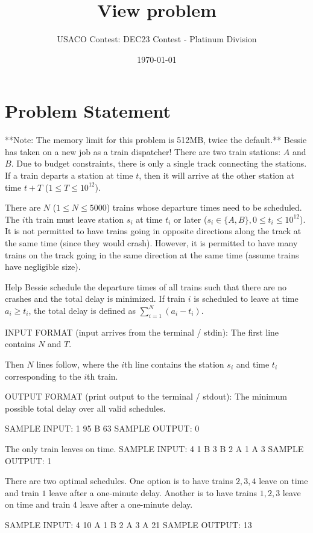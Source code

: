 \documentclass[12pt]{article}
\title{View problem}
\author{USACO Contest: DEC23 Contest - Platinum Division}
\date{\today}
\begin{document}
\maketitle

\section*{Problem Statement}


**Note: The memory limit for this problem is 512MB, twice the default.**
Bessie has taken on a new job as a train dispatcher! There are two train
stations: $A$ and $B$. Due to budget constraints, there is only a single track
connecting the stations. If a train departs a station at time $t$, then it will
arrive at the other station at time $t+T$ ($1\le T\le 10^{12}$).

There are $N$ ($1\le N\le 5000$) trains whose departure times need to be
scheduled. The $i$th train must leave station $s_i$ at time $t_i$ or later
($s_i\in \{A, B\}, 0\le t_i\le 10^{12}$).  It is not permitted to have trains
going in opposite directions along the track at the same time (since they would
crash).  However, it is permitted to have many trains on the track going in the
same direction at the same time (assume trains  have negligible size).

Help Bessie schedule the departure times of all trains such that there are no
crashes and the total delay is minimized. If train $i$ is scheduled to leave at
time $a_i\ge t_i$, the total delay is defined as $\sum_{i=1}^N(a_i-t_i)$.

INPUT FORMAT (input arrives from the terminal / stdin):
The first line contains $N$ and $T$.

Then $N$ lines follow, where the $i$th line  contains the station $s_i$  and
time $t_i$ corresponding to the $i$th train.

OUTPUT FORMAT (print output to the terminal / stdout):
The minimum possible total delay over all valid schedules.

SAMPLE INPUT:
1 95
B 63
SAMPLE OUTPUT: 
0

The only train leaves on time.
SAMPLE INPUT:
4 1
B 3
B 2
A 1
A 3
SAMPLE OUTPUT: 
1

There are two optimal schedules. One option is to have trains $2,3,4$ leave on
time and train $1$ leave after a one-minute delay. Another is to have trains
$1,2,3$ leave on time and train $4$ leave after a one-minute delay.

SAMPLE INPUT:
4 10
A 1
B 2
A 3
A 21
SAMPLE OUTPUT: 
13
\end{document}
